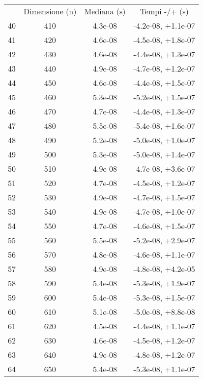 \begin{table}
\centering
\begin{adjustbox}{width=1\textwidth/2}
\begin{tabular}{|c|c|c|c|}
\hline
 & Dimensione (n) & Mediana (s) & Tempi -/+ (s) \\
40 & 410 & 4.3e-08 & -4.2e-08, +1.1e-07 \\
\cline{1-4}
41 & 420 & 4.6e-08 & -4.5e-08, +1.8e-07 \\
\cline{1-4}
42 & 430 & 4.6e-08 & -4.4e-08, +1.3e-07 \\
\cline{1-4}
43 & 440 & 4.9e-08 & -4.7e-08, +1.2e-07 \\
\cline{1-4}
44 & 450 & 4.6e-08 & -4.4e-08, +1.5e-07 \\
\cline{1-4}
45 & 460 & 5.3e-08 & -5.2e-08, +1.5e-07 \\
\cline{1-4}
46 & 470 & 4.7e-08 & -4.4e-08, +1.3e-07 \\
\cline{1-4}
47 & 480 & 5.5e-08 & -5.4e-08, +1.6e-07 \\
\cline{1-4}
48 & 490 & 5.2e-08 & -5.0e-08, +1.0e-07 \\
\cline{1-4}
49 & 500 & 5.3e-08 & -5.0e-08, +1.4e-07 \\
\cline{1-4}
50 & 510 & 4.9e-08 & -4.7e-08, +3.6e-07 \\
\cline{1-4}
51 & 520 & 4.7e-08 & -4.5e-08, +1.2e-07 \\
\cline{1-4}
52 & 530 & 4.9e-08 & -4.7e-08, +1.5e-07 \\
\cline{1-4}
53 & 540 & 4.9e-08 & -4.7e-08, +1.0e-07 \\
\cline{1-4}
54 & 550 & 4.7e-08 & -4.6e-08, +1.5e-07 \\
\cline{1-4}
55 & 560 & 5.5e-08 & -5.2e-08, +2.9e-07 \\
\cline{1-4}
56 & 570 & 4.8e-08 & -4.6e-08, +1.1e-07 \\
\cline{1-4}
57 & 580 & 4.9e-08 & -4.8e-08, +4.2e-05 \\
\cline{1-4}
58 & 590 & 5.4e-08 & -5.3e-08, +1.9e-07 \\
\cline{1-4}
59 & 600 & 5.4e-08 & -5.3e-08, +1.5e-07 \\
\cline{1-4}
60 & 610 & 5.1e-08 & -5.0e-08, +8.8e-08 \\
\cline{1-4}
61 & 620 & 4.5e-08 & -4.4e-08, +1.1e-07 \\
\cline{1-4}
62 & 630 & 4.6e-08 & -4.5e-08, +1.2e-07 \\
\cline{1-4}
63 & 640 & 4.9e-08 & -4.8e-08, +1.2e-07 \\
\cline{1-4}
64 & 650 & 5.4e-08 & -5.3e-08, +1.1e-07 \\

\end{tabular}
\end{adjustbox}
\end{table}
